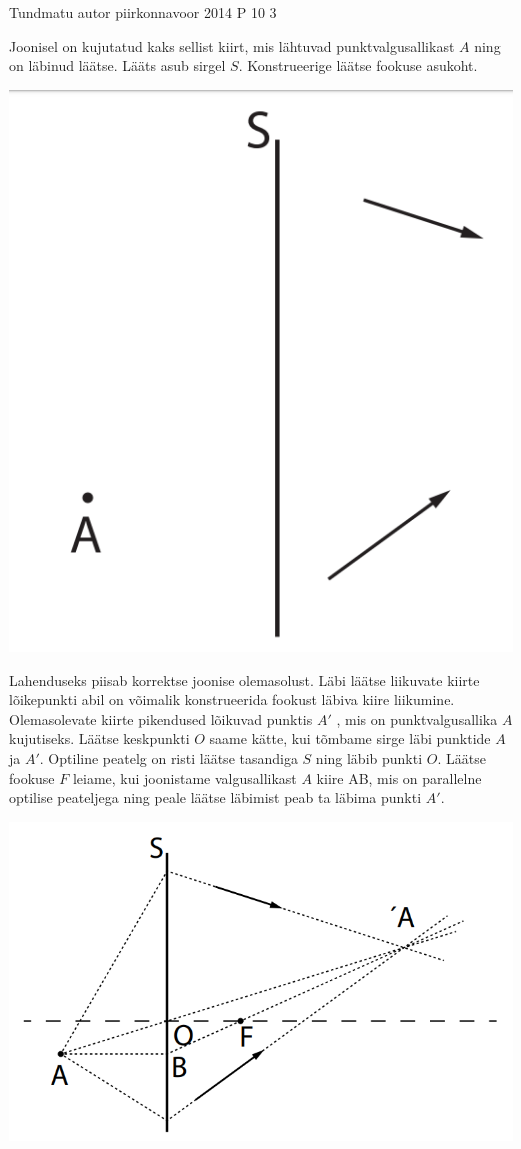 {Tundmatu autor} %
{piirkonnavoor} %
{2014} %
{P 10} %
{3} %
{
\ifStatement
Joonisel on kujutatud kaks sellist kiirt, mis lähtuvad punktvalgusallikast $A$ ning on läbinud läätse. Lääts asub sirgel $S$. Konstrueerige läätse fookuse asukoht.
\begin{center}
	\includegraphics[width=0.5\linewidth]{2014-v2p-10-yl.PNG}
\end{center}
\fi
\ifHint
Lahenduseks piisab korrektse joonise olemasolust. Läbi läätse liikuvate kiirte lõikepunkti abil on võimalik konstrueerida fookust läbiva kiire liikumine.
\fi
\ifSolution
Olemasolevate kiirte pikendused lõikuvad punktis $A'$ , mis on punktvalgusallika $A$ kujutiseks. Läätse keskpunkti $O$ saame kätte, kui tõmbame sirge läbi punktide $A$ ja $A'$. Optiline peatelg on risti läätse tasandiga $S$ ning läbib punkti $O$. Läätse fookuse $F$ leiame, kui joonistame valgusallikast $A$ kiire AB, mis on parallelne optilise peateljega ning peale läätse läbimist peab ta läbima punkti $A'$.
\begin{center}
	\includegraphics[width=0.5\linewidth]{2014-v2p-10-lah.PNG}
\end{center}
\fi
}
